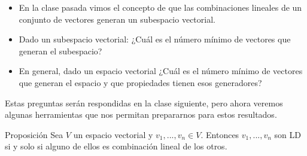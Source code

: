 \documentclass[handout]{beamer} %
\begin{document}
    
    
    
    \begin{frame}
    \begin{itemize}
    \item En  la clase pasada vimos el concepto de que las combinaciones lineales de un conjunto de vectores generan un subespacio vectorial.\pause
    \item Dado un subespacio vectorial: ¿Cuál es el  número mínimo de vectores que generan el subespacio?
    \item En  general, dado un espacio vectorial ¿Cuál es el  número mínimo de vectores que generan el espacio y que propiedades tienen esos generadores?\pause
    
    \end{itemize}
    \vskip 1cm\pause
    Estas preguntas serán respondidas en la clase siguiente,  pero ahora veremos algunas herramientas que nos permitan prepararnos para estos resultados.   
    \end{frame}  
    
    
    
    
    
    
    
    \begin{frame}
    
    \begin{block}{Proposición}
    Sea $V$ un espacio vectorial y $v_1, ..., v_n\in V$. Entonces $v_1, ..., v_n$ son LD si y solo si alguno de ellos es combinación lineal de los otros.
    \end{block}\pause
    
    
    \end{frame}
    
\end{document}
